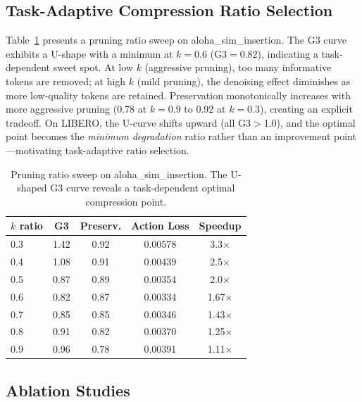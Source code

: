 \documentclass[10pt,twocolumn]{article}
\begin{document}
\subsection{Task-Adaptive Compression Ratio Selection}
\label{sec:ratio_sweep}

Table~\ref{tab:ratio} presents a pruning ratio sweep on aloha\_sim\_insertion. The G3 curve exhibits a U-shape with a minimum at $k{=}0.6$ (G3${=}0.82$), indicating a task-dependent sweet spot. At low $k$ (aggressive pruning), too many informative tokens are removed; at high $k$ (mild pruning), the denoising effect diminishes as more low-quality tokens are retained. Preservation monotonically increases with more aggressive pruning (0.78 at $k{=}0.9$ to 0.92 at $k{=}0.3$), creating an explicit tradeoff. On LIBERO, the U-curve shifts upward (all G3$>$1.0), and the optimal point becomes the \emph{minimum degradation} ratio rather than an improvement point---motivating task-adaptive ratio selection.

\begin{table}[t]
\centering
\caption{Pruning ratio sweep on aloha\_sim\_insertion. The U-shaped G3 curve reveals a task-dependent optimal compression point.}
\label{tab:ratio}
\small
\begin{tabular}{@{}lcccc@{}}
\toprule
$k$ ratio & G3 & Preserv. & Action Loss & Speedup \\
\midrule
0.3 & 1.42 & 0.92 & 0.00578 & 3.3$\times$ \\
0.4 & 1.08 & 0.91 & 0.00439 & 2.5$\times$ \\
0.5 & 0.87 & 0.89 & 0.00354 & 2.0$\times$ \\
0.6 & 0.82 & 0.87 & 0.00334 & 1.67$\times$ \\
0.7 & 0.85 & 0.85 & 0.00346 & 1.43$\times$ \\
0.8 & 0.91 & 0.82 & 0.00370 & 1.25$\times$ \\
0.9 & 0.96 & 0.78 & 0.00391 & 1.11$\times$ \\
\bottomrule
\end{tabular}
\end{table}

\subsection{Ablation Studies}
\label{sec:ablation}
\end{document}
